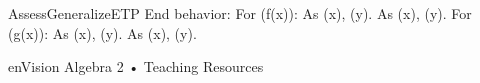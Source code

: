 \documentclass{article}
\newenvironment{te-addendum}[2]{}{}     %
\newcommand{\answer}[1]{}               %
\begin{document}
\begin{te-addendum}{Assess}{GeneralizeETP}
End behavior:
For (f(x)): As (x\to\underline{\hspace{1cm}}), (y\to\underline{\hspace{1cm}}). As (x\to\underline{\hspace{1cm}}), (y\to\underline{\hspace{1cm}}).
For (g(x)): As (x\to\underline{\hspace{1cm}}), (y\to\underline{\hspace{1cm}}). As (x\to\underline{\hspace{1cm}}), (y\to\underline{\hspace{1cm}}).
\answer{9. For (f(x)): As (x\to+\infty), (y\to+\infty); as (x\to-\infty), (y\to-\infty). For (g(x)): As (x\to+\infty), (y\to+\infty); as (x\to-\infty), (y\to+\infty).}
enVision Algebra 2 • Teaching Resources
\end{te-addendum}
\end{document}
